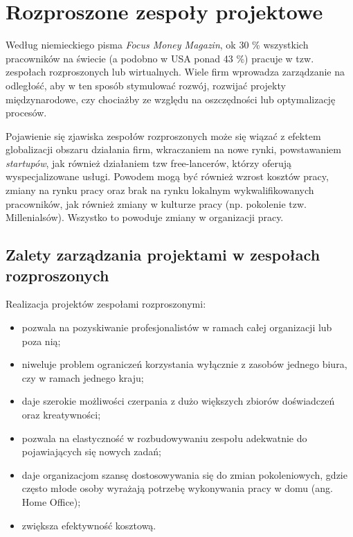 
\chapter{Rozproszone zespoły projektowe}

Według niemieckiego pisma \textit{Focus Money Magazin},
ok 30 \% wszystkich pracowników na świecie (a podobno w USA ponad 43 \%) pracuje w tzw.
zespołach rozproszonych lub wirtualnych.
Wiele firm wprowadza zarządzanie na odległość, aby w ten sposób stymulować rozwój,
rozwijać projekty międzynarodowe, czy chociażby ze względu na oszczędności lub optymalizację procesów.

Pojawienie się zjawiska zespołów rozproszonych może się wiązać z efektem globalizacji obszaru działania firm,
wkraczaniem na nowe rynki, powstawaniem \textit{startupów}, jak również działaniem tzw free-lancerów,
którzy oferują wyspecjalizowane usługi.
Powodem mogą być również wzrost kosztów pracy, zmiany na rynku pracy oraz brak na rynku lokalnym
wykwalifikowanych pracowników, jak również zmiany w kulturze pracy
(np. pokolenie tzw. Millenialsów). Wszystko to powoduje zmiany w organizacji pracy.

\section{Zalety zarządzania projektami w zespołach rozproszonych}

Realizacja projektów zespołami rozproszonymi:

\begin{itemize}
	\item pozwala na pozyskiwanie profesjonalistów w ramach całej organizacji lub poza nią;
	\item niweluje problem ograniczeń korzystania wyłącznie z zasobów jednego biura, czy w ramach jednego kraju;
	\item daje szerokie możliwości czerpania z dużo większych zbiorów doświadczeń oraz kreatywności;
	\item pozwala na elastyczność w rozbudowywaniu zespołu adekwatnie do pojawiających się nowych zadań;
	\item daje organizacjom szansę dostosowywania się do zmian pokoleniowych,
	gdzie często młode osoby wyrażają potrzebę wykonywania pracy w domu (ang. Home Office);
	\item zwiększa efektywność kosztową.
\end{itemize}


